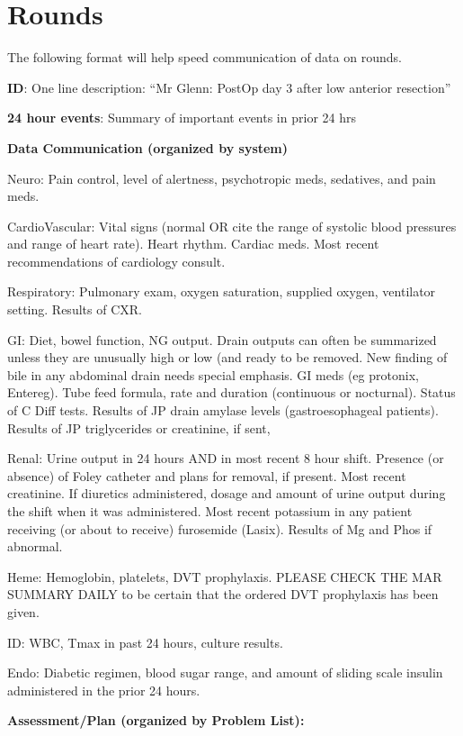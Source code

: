 \documentclass[
]{book}
\begin{document}
\hypertarget{rounds-2}{%
\chapter{Rounds}\label{rounds-2}}

The following format will help speed communication of data on rounds.

\textbf{ID}: One line description: ``Mr Glenn: PostOp day 3 after low anterior resection''

\textbf{24 hour events}: Summary of important events in prior 24 hrs

\textbf{Data Communication (organized by system)}

Neuro: Pain control, level of alertness, psychotropic meds, sedatives, and pain meds.

CardioVascular: Vital signs (normal OR cite the range of systolic blood pressures and range of heart rate). Heart rhythm. Cardiac meds. Most recent recommendations of cardiology consult.

Respiratory: Pulmonary exam, oxygen saturation, supplied oxygen, ventilator setting. Results of CXR.

GI: Diet, bowel function, NG output. Drain outputs can often be summarized unless they are unusually high or low (and ready to be removed. New finding of bile in any abdominal drain needs special emphasis. GI meds (eg protonix, Entereg). Tube feed formula, rate and duration (continuous or nocturnal). Status of C Diff tests. Results of JP drain amylase levels (gastroesophageal patients). Results of JP triglycerides or creatinine, if sent,

Renal: Urine output in 24 hours AND in most recent 8 hour shift. Presence (or absence) of Foley catheter and plans for removal, if present. Most recent creatinine. If diuretics administered, dosage and amount of urine output during the shift when it was administered. Most recent potassium in any patient receiving (or about to receive) furosemide (Lasix). Results of Mg and Phos if abnormal.

Heme: Hemoglobin, platelets, DVT prophylaxis. PLEASE CHECK THE MAR SUMMARY DAILY to be certain that the ordered DVT prophylaxis has been given.

ID: WBC, Tmax in past 24 hours, culture results.

Endo: Diabetic regimen, blood sugar range, and amount of sliding scale insulin administered in the prior 24 hours.

\textbf{Assessment/Plan (organized by Problem List):}
\end{document}
